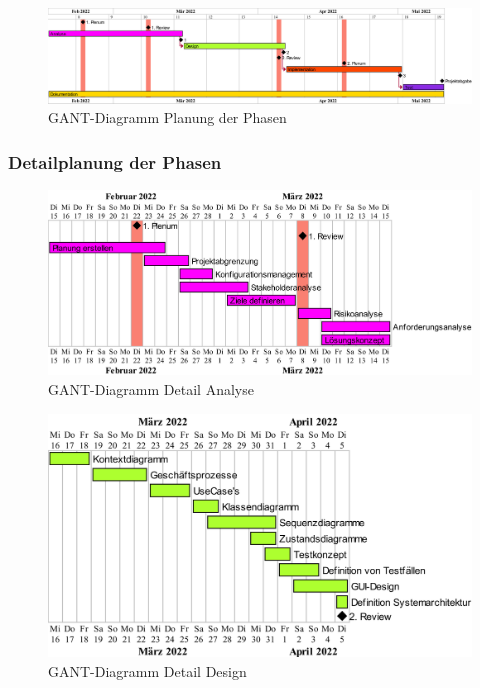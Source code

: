 \vspace*{3mm}

\begin{figure}[H]
    \begin{center}
        \includegraphics[width=1\linewidth]{content/diagrams/out/planning/planning/Planning.png}
        \caption{GANT-Diagramm Planung der Phasen}
      \end{center}
\end{figure}

\subsubsection{Detailplanung der Phasen}
\begin{figure}[H]
  \begin{center}
      \includegraphics[width=0.65\linewidth]{content/diagrams/out/planning/analyse/Analyse.png}
      \caption{GANT-Diagramm Detail Analyse}
    \end{center}
\end{figure}

\begin{figure}[H]
  \begin{center}
      \includegraphics[width=0.6\linewidth]{content/diagrams/out/planning/Design/Design.png}
      \caption{GANT-Diagramm Detail Design}
    \end{center}
\end{figure}

